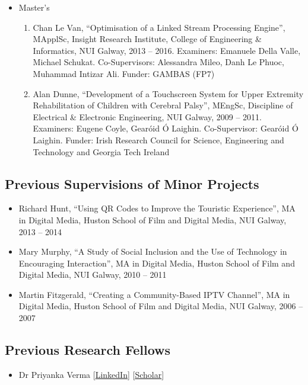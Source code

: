 \documentclass[10pt,a4paper]{res} %
\begin{document}
\begin{resume}
\begin{itemize}
\item Master's
\begin{enumerate} \itemsep -2pt
\item Chan Le Van, ``Optimisation of a Linked Stream Processing Engine'', MApplSc, Insight Research Institute, College of Engineering \& Informatics, NUI Galway, 2013 -- 2016. Examiners: Emanuele Della Valle, Michael Schukat. Co-Supervisors: Alessandra Mileo, Danh Le Phuoc, Muhammad Intizar Ali. Funder: GAMBAS (FP7)
\item Alan Dunne, ``Development of a Touchscreen System for Upper Extremity Rehabilitation of Children with Cerebral Palsy'', MEngSc, Discipline of Electrical \& Electronic Engineering, NUI Galway, 2009 -- 2011. Examiners: Eugene Coyle, Gear\'{o}id \'{O} Laighin. Co-Supervisor: Gear\'{o}id \'{O} Laighin. Funder: Irish Research Council for Science, Engineering and Technology and Georgia Tech Ireland
\end{enumerate}
\end{itemize}

\subsection*{Previous Supervisions of Minor Projects}

\begin{itemize} \itemsep -2pt
\item Richard Hunt, ``Using QR Codes to Improve the Touristic Experience'', MA in Digital Media, Huston School of Film and Digital Media, NUI Galway, 2013 -- 2014
\item Mary Murphy, ``A Study of Social Inclusion and the Use of Technology in Encouraging Interaction'', MA in Digital Media, Huston School of Film and Digital Media, NUI Galway, 2010 -- 2011
\item Martin Fitzgerald, ``Creating a Community-Based IPTV Channel'', MA in Digital Media, Huston School of Film and Digital Media, NUI Galway, 2006 -- 2007
\end{itemize}

\subsection*{Previous Research Fellows}

\begin{itemize} \itemsep -2pt
\item Dr Priyanka Verma
[\href{https://www.linkedin.com/in/priyankavermaphd/}{LinkedIn}]
[\href{https://scholar.google.com/citations?hl=en&user=BNKQ-UgAAAAJ}{Scholar}]
\end{itemize}


\end{resume}
\end{document}
